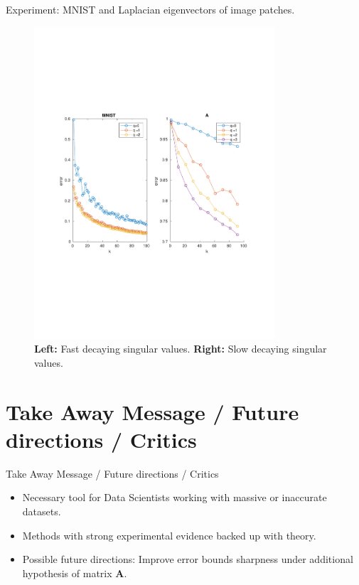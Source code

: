 \documentclass{beamer}
\newcommand{\mtx}[1]{\bm{#1}}
\begin{document}
\begin{frame}{Experiment: MNIST and Laplacian eigenvectors of image patches.}
\begin{figure}[H] \label{fig:exp2}
\begin{center}
\includegraphics[width=0.8\textwidth, trim=0cm 8cm 0cm 7cm, clip=true]{../report/figures/2-1.pdf}
\end{center}
\caption{\textbf{Left:} Fast decaying singular values. \textbf{Right:} Slow decaying singular
values.}
\end{figure}
\end{frame}


\section{Take Away Message / Future directions / Critics}
\begin{frame}{Take Away Message / Future directions / Critics}
\begin{itemize}
  \item Necessary tool for Data Scientists working with massive or inaccurate 
  datasets.
  \item Methods with strong experimental evidence backed up with theory.
  \item Possible future directions: Improve error bounds sharpness under
  additional hypothesis
  of matrix $\mtx{A}$.
\end{itemize}
\end{frame}
\end{document}
